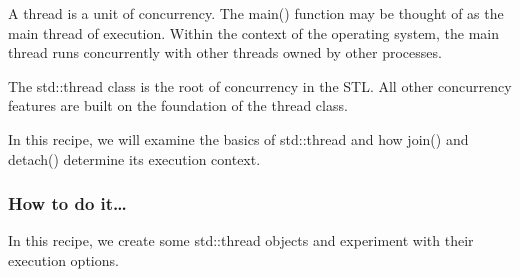 
A thread is a unit of concurrency. The main() function may be thought of as the main thread of execution. Within the context of the operating system, the main thread runs concurrently with other threads owned by other processes.

The std::thread class is the root of concurrency in the STL. All other concurrency features are built on the foundation of the thread class.

In this recipe, we will examine the basics of std::thread and how join() and detach() determine its execution context.

\subsubsection{How to do it…}

In this recipe, we create some std::thread objects and experiment with their execution options.


